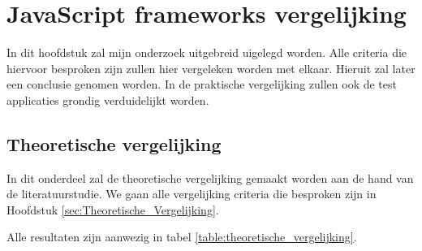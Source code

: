 
\chapter{JavaScript frameworks vergelijking}
\label{ch:onderzoek}

In dit hoofdstuk zal mijn onderzoek uitgebreid uigelegd worden. Alle criteria die hiervoor besproken zijn zullen hier vergeleken worden met elkaar. Hieruit zal later een conclusie genomen worden. In de praktische vergelijking zullen ook de test applicaties grondig verduidelijkt worden.

\section{Theoretische vergelijking}
\label{sec:theoretische_vergelijking}

In dit onderdeel zal de theoretische vergelijking gemaakt worden aan de hand van de literatuurstudie. We gaan alle vergelijking criteria die besproken zijn in Hoofdstuk \ref{sec:Theoretische_Vergelijking}.

Alle resultaten zijn aanwezig in tabel \ref{table:theoretische_vergelijking}.

